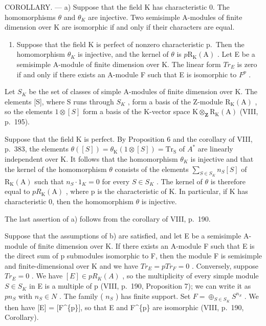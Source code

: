 COROLLARY. --- a) Suppose that the field K has characteristic 0. The homomorphisms \(\theta\) and \(\theta_{K}\) are injective. Two semisimple A-modules of finite dimension over K are isomorphic if and only if their characters are equal.

\begin{enumerate}
\def\labelenumi{\alph{enumi})}
\setcounter{enumi}{1}
\tightlist
\item
  Suppose that the field K is perfect of nonzero characteristic p.~Then the homomorphism \(\theta_{K}\) is injective, and the kernel of \(\theta\) is \(p\mathrm{R}_{\mathrm{K}}(\mathrm{A})\) . Let E be a semisimple A-module of finite dimension over K. The linear form \(Tr_{E}\) is zero if and only if there exists an A-module F such that E is isomorphic to \(F^{p}\) .
\end{enumerate}

Let \(S_{K}\) be the set of classes of simple A-modules of finite dimension over K. The elements {[}S{]}, where S runs through \(S_{K}\) , form a basis of the Z-module \(\mathrm{R}_{\mathrm{K}}(\mathrm{A})\) , so the elements \(1 \otimes [S]\) form a basis of the K-vector space \(\mathrm{K} \otimes_{\mathbf{Z}} \mathrm{R}_{\mathrm{K}}(\mathrm{A})\) (VIII, p.~195).

Suppose that the field K is perfect. By Proposition 6 and the corollary of VIII, p.~383, the elements \(\theta([S]) = \theta_{\mathrm{K}}(1 \otimes [S]) = \mathrm{Tr}_{\mathrm{S}}\) of \(A^{*}\) are linearly independent over K. It follows that the homomorphism \(\theta_{K}\) is injective and that the kernel of the homomorphism \(\theta\) consists of the elements \(\sum_{S \in S_{K}} n_{S}[S]\) of \(\mathrm{R}_{\mathrm{K}}(\mathrm{A})\) such that \(n_{S} \cdot 1_{K} = 0\) for every \(S \in S_{K}\) . The kernel of \(\theta\) is therefore equal to \(p R_{\mathrm{K}}(\mathrm{A})\) , where p is the characteristic of K. In particular, if K has characteristic 0, then the homomorphism \(\theta\) is injective.

The last assertion of a) follows from the corollary of VIII, p.~190.

Suppose that the assumptions of b) are satisfied, and let E be a semisimple A-module of finite dimension over K. If there exists an A-module F such that E is the direct sum of p submodules isomorphic to F, then the module F is semisimple and finite-dimensional over K and we have \(Tr_{E} = p Tr_{F} = 0\) . Conversely, suppose \(Tr_{E} = 0\) . We have \([E] \in p R_{K}(A)\) , so the multiplicity of every simple module \(S \in S_{K}\) in E is a multiple of p (VIII, p.~190, Proposition 7); we can write it as \(pn_{S}\) with \(n_{S} \in N\) . The family ( \(n_{S}\) ) has finite support. Set \(F = \oplus_{S \in S_{K}} S^{n_{S}}\) . We then have {[}E{]} = {[}F\^{}\{p\}{]}, so that E and F\^{}\{p\} are isomorphic (VIII, p.~190, Corollary).

